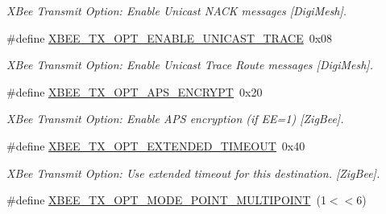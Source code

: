 \begin{DoxyCompactItemize}
\begin{DoxyCompactList}\small\item\em X\-Bee Transmit Option\-: Enable Unicast N\-A\-C\-K messages \mbox{[}Digi\-Mesh\mbox{]}. \end{DoxyCompactList}\item 
\hypertarget{group__xbee__wpan_ga44452074ba3205f9860d4d16e339aba1}{\#define \hyperlink{group__xbee__wpan_ga44452074ba3205f9860d4d16e339aba1}{X\-B\-E\-E\-\_\-\-T\-X\-\_\-\-O\-P\-T\-\_\-\-E\-N\-A\-B\-L\-E\-\_\-\-U\-N\-I\-C\-A\-S\-T\-\_\-\-T\-R\-A\-C\-E}~0x08}\label{group__xbee__wpan_ga44452074ba3205f9860d4d16e339aba1}

\begin{DoxyCompactList}\small\item\em X\-Bee Transmit Option\-: Enable Unicast Trace Route messages \mbox{[}Digi\-Mesh\mbox{]}. \end{DoxyCompactList}\item 
\hypertarget{group__xbee__wpan_ga0a9bf2b58851b7d8db5359aefef3cfe0}{\#define \hyperlink{group__xbee__wpan_ga0a9bf2b58851b7d8db5359aefef3cfe0}{X\-B\-E\-E\-\_\-\-T\-X\-\_\-\-O\-P\-T\-\_\-\-A\-P\-S\-\_\-\-E\-N\-C\-R\-Y\-P\-T}~0x20}\label{group__xbee__wpan_ga0a9bf2b58851b7d8db5359aefef3cfe0}

\begin{DoxyCompactList}\small\item\em X\-Bee Transmit Option\-: Enable A\-P\-S encryption (if E\-E=1) \mbox{[}Zig\-Bee\mbox{]}. \end{DoxyCompactList}\item 
\hypertarget{group__xbee__wpan_ga60a1c57a93cd57570fb73bae97535fcb}{\#define \hyperlink{group__xbee__wpan_ga60a1c57a93cd57570fb73bae97535fcb}{X\-B\-E\-E\-\_\-\-T\-X\-\_\-\-O\-P\-T\-\_\-\-E\-X\-T\-E\-N\-D\-E\-D\-\_\-\-T\-I\-M\-E\-O\-U\-T}~0x40}\label{group__xbee__wpan_ga60a1c57a93cd57570fb73bae97535fcb}

\begin{DoxyCompactList}\small\item\em X\-Bee Transmit Option\-: Use extended timeout for this destination. \mbox{[}Zig\-Bee\mbox{]}. \end{DoxyCompactList}\item 
\hypertarget{group__xbee__wpan_gab96b311d46a70649710385c64dde72f2}{\#define \hyperlink{group__xbee__wpan_gab96b311d46a70649710385c64dde72f2}{X\-B\-E\-E\-\_\-\-T\-X\-\_\-\-O\-P\-T\-\_\-\-M\-O\-D\-E\-\_\-\-P\-O\-I\-N\-T\-\_\-\-M\-U\-L\-T\-I\-P\-O\-I\-N\-T}~(1$<$$<$6)}\label{group__xbee__wpan_gab96b311d46a70649710385c64dde72f2}


\end{DoxyCompactItemize}
